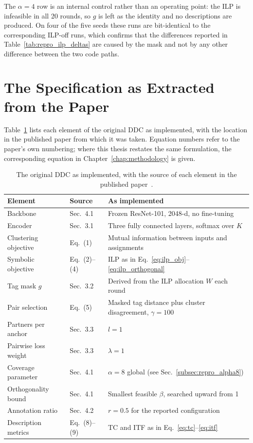 The $\alpha = 4$ row is an internal control rather than an operating point: the ILP is infeasible in all 20 rounds, so $g$ is left as the identity and no descriptions are produced. On four of the five seeds these runs are bit-identical to the corresponding ILP-off runs, which confirms that the differences reported in Table~\ref{tab:repro_ilp_deltas} are caused by the mask and not by any other difference between the two code paths.

\section{The Specification as Extracted from the Paper}
\label{sec:c_spec}

Table~\ref{tab:c_spec} lists each element of the original DDC as implemented, with the location in the published paper from which it was taken. Equation numbers refer to the paper's own numbering; where this thesis restates the same formulation, the corresponding equation in Chapter~\ref{chap:methodology} is given.

\begin{table}[H]
    \centering
    \footnotesize
    \caption[Extracted specification of the original DDC]{The original DDC as implemented, with the source of each element in the published paper~\citep{Zhang2021}.}
    \label{tab:c_spec}
    \begin{tabular}{p{4.6cm}p{2.4cm}p{6.0cm}}
        \toprule
        \textbf{Element} & \textbf{Source} & \textbf{As implemented} \\
        \midrule
        Backbone & Sec.\ 4.1 & Frozen ResNet-101, 2048-d, no fine-tuning \\
        Encoder & Sec.\ 3.1 & Three fully connected layers, softmax over $K$ \\
        Clustering objective & Eq.\ (1) & Mutual information between inputs and assignments \\
        Symbolic objective & Eq.\ (2)--(4) & ILP as in Eq.~\ref{eq:ilp_obj}--\ref{eq:ilp_orthogonal} \\
        Tag mask $g$ & Sec.\ 3.2 & Derived from the ILP allocation $W$ each round \\
        Pair selection & Eq.\ (5) & Masked tag distance plus cluster disagreement, $\gamma = 100$ \\
        Partners per anchor & Sec.\ 3.3 & $l = 1$ \\
        Pairwise loss weight & Sec.\ 3.3 & $\lambda = 1$ \\
        Coverage parameter & Sec.\ 4.1 & $\alpha = 8$ global (see Sec.~\ref{subsec:repro_alpha8}) \\
        Orthogonality bound & Sec.\ 4.1 & Smallest feasible $\beta$, searched upward from 1 \\
        Annotation ratio & Sec.\ 4.2 & $r = 0.5$ for the reported configuration \\
        Description metrics & Eq.\ (8)--(9) & TC and ITF as in Eq.~\ref{eq:tc}--\ref{eq:itf} \\
        \bottomrule
    \end{tabular}
\end{table}


